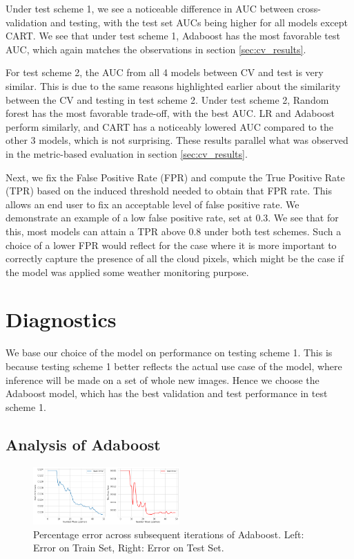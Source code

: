 \documentclass[11pt, letterpaper, journal]{IEEEtran}
\begin{document}
Under test scheme 1, we see a noticeable difference in AUC between cross-validation and testing, with the test set AUCs being higher for all models except CART. We see that under test scheme 1, Adaboost has the most favorable test AUC, which again matches the observations in section \ref{sec:cv_results}.

For test scheme 2, the AUC from all 4 models between CV and test is very similar. This is due to the same reasons highlighted earlier about the similarity between the CV and testing in test scheme 2. Under test scheme 2, Random forest has the most favorable trade-off, with the best AUC. LR and Adaboost perform similarly, and CART has a noticeably lowered AUC compared to the other 3 models, which is not surprising. These results parallel what was observed in the metric-based evaluation in section \ref{sec:cv_results}.

Next, we fix the False Positive Rate (FPR) and compute the True Positive Rate (TPR) based on the induced threshold needed to obtain that FPR rate. This allows an end user to fix an acceptable level of false positive rate. We demonstrate an example of a low false positive rate, set at 0.3. We see that for this, most models can attain a TPR above 0.8 under both test schemes. Such a choice of a lower FPR would reflect for the case where it is more important to correctly capture the presence of all the cloud pixels, which might be the case if the model was applied some weather monitoring purpose.


\section{Diagnostics}
We base our choice of the model on performance on testing scheme 1. This is because testing scheme 1 better reflects the actual use case of the model, where inference will be made on a set of whole new images. Hence we choose the Adaboost model, which has the best validation and test performance in test scheme 1.

\subsection{Analysis of Adaboost}
\begin{figure}[h]
    \centering
    \includegraphics[width=0.5\textwidth]{statics/ada_iterations_tr_23_te_1.png}
    \caption{Percentage error across subsequent iterations of Adaboost. Left: Error on Train Set, Right: Error on Test Set.}
    \label{fig:Adaboost_iterations}
\end{figure}
\end{document}
